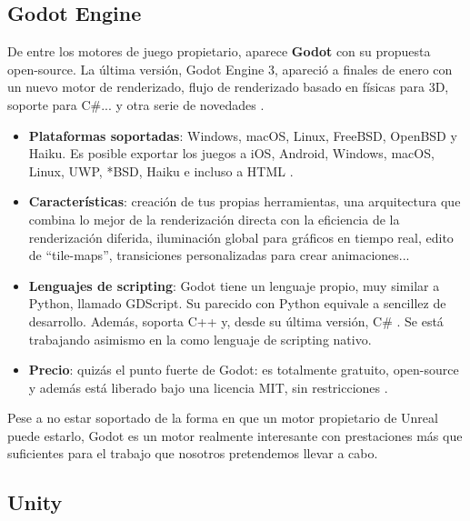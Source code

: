 \subsection{Godot Engine}
De entre los motores de juego propietario, aparece \textbf{Godot} con su propuesta open-source. La última versión, Godot Engine 3, apareció a finales de enero con un nuevo motor de renderizado, flujo de renderizado basado en físicas para 3D, soporte para C\#... y otra serie de novedades \cite{newgodot}.
\begin{itemize}
\item \textbf{Plataformas soportadas}: Windows, macOS, Linux, FreeBSD, OpenBSD y Haiku. Es posible exportar los juegos a iOS, Android, Windows, macOS, Linux, UWP, *BSD, Haiku e incluso a HTML \cite{godotfeatures}.
\item \textbf{Características}: creación de tus propias herramientas, una arquitectura que combina lo mejor de la renderización directa con la eficiencia de la renderización diferida, iluminación global para gráficos en tiempo real, edito de ``tile-maps'', transiciones personalizadas para crear animaciones...\cite{godotfeatures}
\item \textbf{Lenguajes de scripting}: Godot tiene un lenguaje propio, muy similar a Python, llamado GDScript. Su parecido con Python equivale a sencillez de desarrollo. Además, soporta C++ y, desde su última versión, C\# \cite{godotfeatures}. Se está trabajando asimismo en la  como lenguaje de scripting nativo.
\item \textbf{Precio}: quizás el punto fuerte de Godot: es totalmente gratuito, open-source y además está liberado bajo una licencia MIT, sin restricciones \cite{godotfree}.
\end{itemize}

Pese a no estar soportado de la forma en que un motor propietario de Unreal puede estarlo, Godot es un motor realmente interesante con prestaciones más que suficientes para el trabajo que nosotros pretendemos llevar a cabo.

\subsection{Unity}